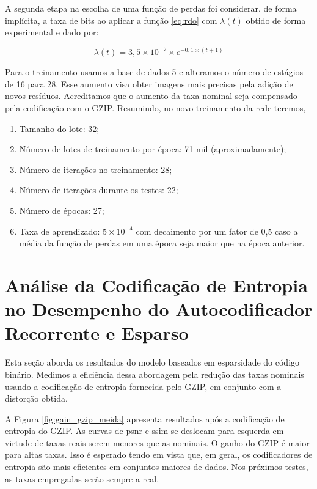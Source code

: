 A segunda etapa na escolha de uma função de perdas foi considerar, de forma implícita, a taxa de bits ao aplicar a função \ref{eq:rdo} com $\lambda(t)$ obtido de forma experimental e dado por: 

\begin{equation}
\lambda(t) = 3,5 \times 10^{-7} \times e^{-0,1 \times (t+1)}  
\end{equation}

Para o treinamento usamos a base de dados 5 e alteramos o número de estágios de 16 para 28. Esse aumento visa obter imagens mais precisas pela adição de novos resíduos. Acreditamos que o aumento da taxa nominal seja compensado pela codificação com o GZIP.  Resumindo, no novo treinamento da rede teremos,

\begin{enumerate}
	\label{enum:hiper_param2}
	\item Tamanho do lote: 32;  
	\item Número de lotes de treinamento por época: 71 mil (aproximadamente);   
	\item Número de iterações no treinamento: 28;
	\item Número de iterações durante os testes: 22;
	\item Número de épocas: 27;
	\item Taxa de aprendizado: $5 \times {10}^{-4}$ com decaimento por um fator de 0,5 caso a média da função de perdas em uma época seja maior que na época anterior.
\end{enumerate}


\section{Análise da Codificação de Entropia no Desempenho do Autocodificador Recorrente e Esparso}

Esta seção aborda os resultados do modelo baseados em esparsidade do código binário. Medimos a eficiência dessa abordagem pela redução das taxas nominais usando a codificação de entropia fornecida pelo GZIP, em conjunto com a distorção obtida.    


A Figura \ref{fig:gain_gzip_meida} apresenta resultados após a codificação de entropia do GZIP. As curvas de \acrshort{psnr} e \acrshort{ssim} se deslocam para esquerda em virtude de taxas reais serem menores que as nominais. O ganho do GZIP é maior para altas taxas. Isso é esperado tendo em vista que, em geral, os codificadores de entropia são mais eficientes em conjuntos maiores de dados. Nos próximos testes, as taxas empregadas serão sempre a real.    

